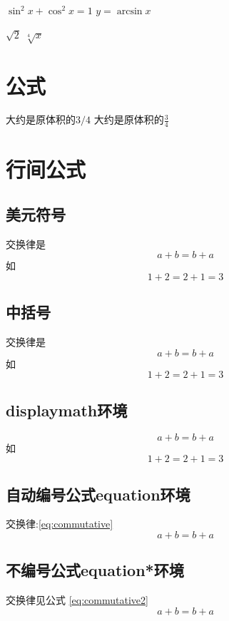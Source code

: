 \documentclass{article}
\begin{document}
    $\sin^2 x + \cos^2 x = 1 $
    $y = \arcsin x $

    
    $\sqrt{2}$
    $\sqrt[4]{x}$
    \section{公式}
    大约是原体积的$3/4$
    大约是原体积的$\frac{3}{4}$

    \section{行间公式}

    \subsection{美元符号}
   交换律是$$a+b=b+a$$
   如$$1+2=2+1=3$$
    \subsection{中括号}
交换律是\[a+b=b+a\]
如\[1+2=2+1=3\]
    \subsection{displaymath环境}
    \begin{displaymath}
        a+b = b+a
    \end{displaymath}
    如
    \begin{displaymath}
        1+2=2+1=3
    \end{displaymath}

    \subsection{自动编号公式equation环境}
    交换律:\ref{eq:commutative}
    \begin{equation}
        a+b=b+a \label{eq:commutative}
    \end{equation}
    \subsection{不编号公式equation*环境}
    交换律见公式 \ref{eq:commutative2}
    \begin{equation*}
        a+b=b+a \label{eq:commutative2}
    \end{equation*}
\end{document}
